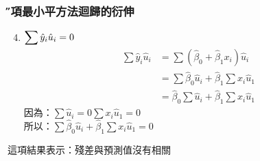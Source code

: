 \documentclass[xcolor=dvipsnames]{beamer}
\begin{document}
\begin{frame}\frametitle{\H 幾項最小平方法迴歸的衍伸}
\begin{enumerate}
\setcounter{enumi}{3}
\item $\mathlarger{\sum \hat{y}_{i}\hat{u}_{i}=0}  $
\begin{align*}
\sum \hat{y}_{i}\hat{u}_{i} & = \sum (\hat{\beta}_{0}+\hat{\beta}_{1}x_{i})\hat{u}_{i}\\
& = \sum \hat{\beta}_{0}\hat{u}_{i}+\hat{\beta}_{1}\sum x_{i}\hat{u}_{1} \\
&= \hat{\beta}_{0}\sum \hat{u}_{i}+\hat{\beta}_{1}\sum x_{i}\hat{u}_{1}
\end{align*}
因為：$\sum \hat{u}_{i}= 0 $\qquad$\sum x_{i}\hat{u}_{1}=0  $\\
所以：$\sum \hat{\beta}_{0}\hat{u}_{i}+\hat{\beta}_{1}\sum x_{i}\hat{u}_{1}= 0 $
\end{enumerate}
這項結果表示：殘差與預測值沒有相關
\end{frame}
\end{document}
